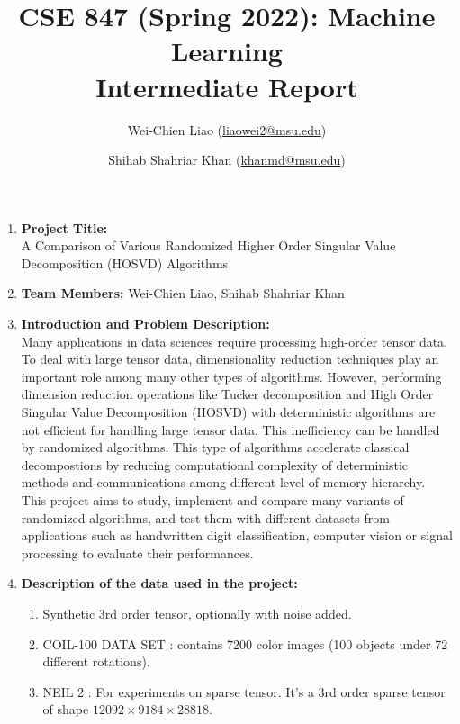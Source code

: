 \documentclass[12pt,a4paper]{article}
\title{\textbf{\large{CSE 847 (Spring 2022): Machine Learning\\ Intermediate Report}}}
\author{
    Wei-Chien Liao (\href{mailto:liaowei2@msu.edu}{liaowei2@msu.edu})
    \and
    Shihab Shahriar Khan (\href{mailto:khanmd@msu.edu}{khanmd@msu.edu})
}
\date{}
\begin{document}
\maketitle
\begin{enumerate}
    \item \textbf{Project Title:}\\
    A Comparison of Various Randomized Higher Order Singular Value Decomposition (HOSVD) Algorithms
    \item \textbf{Team Members:} Wei-Chien Liao, Shihab Shahriar Khan
    \item \textbf{Introduction and Problem Description:}\\
    Many applications in data sciences require processing high-order tensor data. To deal
    with large tensor data, dimensionality reduction techniques play an important role among many other types of algorithms. However,
    performing dimension reduction operations like Tucker decomposition and High Order Singular Value Decomposition (HOSVD)
    with deterministic algorithms are not efficient for handling large tensor data. This inefficiency can be
    handled by randomized algorithms. This type of algorithms accelerate classical decompostions by reducing computational complexity
    of deterministic methods and communications among different level of memory hierarchy. This project aims to study, implement and compare
    many variants of randomized algorithms, and test them with different datasets from applications such as handwritten digit classification, computer vision or signal processing 
    to evaluate their performances.
    \item \textbf{Description of the data used in the project:}
    \begin{enumerate}
        \item Synthetic 3rd order tensor, optionally with noise added.
        \item COIL-100 DATA SET \cite{nene1996columbia}: contains 7200 color images (100 objects under 72 different rotations). 
        \item NEIL 2 \cite{carlson2010toward}: For experiments on sparse tensor. It's a 3rd order sparse tensor of shape $12092 \times 9184 \times 28818$.
    \end{enumerate}
    

\end{enumerate}
\end{document}
